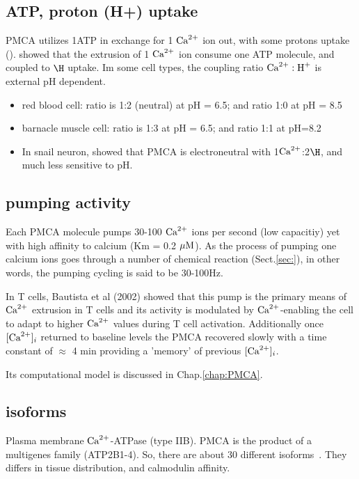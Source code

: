\subsection{ATP, proton (H+) uptake}

PMCA utilizes 1ATP in exchange for 1 ${\text{Ca}^{2+}}$ ion out, with some protons uptake
(). \citep{niggli1982, smallwood1983} showed that the extrusion of 1
${\text{Ca}^{2+}}$ ion consume one ATP molecule, and coupled to $\H$ uptake. Im some cell
types, the coupling ratio  $\ce{Ca^2+}:\ce{H^+}$ is external pH dependent. 
\begin{itemize}
  \item red blood cell: ratio is 1:2 (neutral) at pH = 6.5; and ratio 1:0 at pH
  = 8.5
  \item barnacle muscle cell: ratio is 1:3 at pH = 6.5; and ratio 1:1 at pH=8.2
  
  \item In snail neuron, \citep{thomas2009} showed that PMCA is electroneutral
  with 1${\text{Ca}^{2+}}$:2$\H$, and much less sensitive to pH.
\end{itemize}


\subsection{pumping activity}

Each PMCA molecule pumps 30-100 ${\text{Ca}^{2+}}$ ions per second (low capacitiy) yet with
high affinity to calcium (Km = 0.2 ${\mu\text{M}}$). As the process of pumping one
calcium ions goes through a number of chemical reaction (Sect.\ref{sec:}), in
other words, the pumping cycling is said to be 30-100Hz.

In T cells, Bautista et al (2002) showed that this pump is the primary means of
${\text{Ca}^{2+}}$ extrusion in T cells and its activity is modulated by ${\text{Ca}^{2+}}$-enabling the
cell to adapt to higher ${\text{Ca}^{2+}}$ values during T cell activation.  Additionally
once $[{\text{Ca}^{2+}}]_i$ returned to baseline levels the PMCA recovered slowly with a time
constant of $\approx$ 4 min providing a 'memory' of previous $[{\text{Ca}^{2+}}]_i$.

Its computational model is discussed in Chap.\ref{chap:PMCA}.

\subsection{isoforms}
\label{sec:PMCA-isoforms}

Plasma membrane ${\text{Ca}^{2+}}$-ATPase (type IIB).
PMCA is the product of a multigenes family (ATP2B1-4). So, there are
about 30 different isoforms~\citep{Brini2009}. They differs in tissue
distribution, and calmodulin affinity. 

